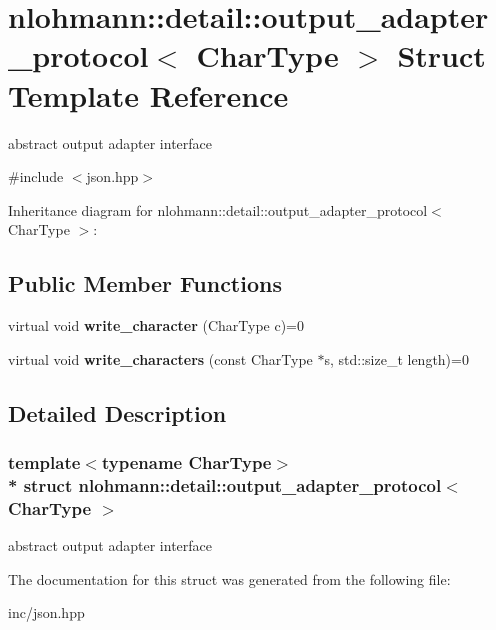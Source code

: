 \hypertarget{structnlohmann_1_1detail_1_1output__adapter__protocol}{}\section{nlohmann\+:\+:detail\+:\+:output\+\_\+adapter\+\_\+protocol$<$ Char\+Type $>$ Struct Template Reference}
\label{structnlohmann_1_1detail_1_1output__adapter__protocol}


abstract output adapter interface  




{\ttfamily \#include $<$json.\+hpp$>$}



Inheritance diagram for nlohmann\+:\+:detail\+:\+:output\+\_\+adapter\+\_\+protocol$<$ Char\+Type $>$\+:
\subsection*{Public Member Functions}
\begin{DoxyCompactItemize}
\item 
virtual void {\bfseries write\+\_\+character} (Char\+Type c)=0\hypertarget{structnlohmann_1_1detail_1_1output__adapter__protocol_a3381896fe1be557f591de2e917cdc7d5}{}\label{structnlohmann_1_1detail_1_1output__adapter__protocol_a3381896fe1be557f591de2e917cdc7d5}

\item 
virtual void {\bfseries write\+\_\+characters} (const Char\+Type $\ast$s, std\+::size\+\_\+t length)=0\hypertarget{structnlohmann_1_1detail_1_1output__adapter__protocol_a2f410a164e0eda17cf6561114b0eee4a}{}\label{structnlohmann_1_1detail_1_1output__adapter__protocol_a2f410a164e0eda17cf6561114b0eee4a}

\end{DoxyCompactItemize}


\subsection{Detailed Description}
\subsubsection*{template$<$typename Char\+Type$>$\\*
struct nlohmann\+::detail\+::output\+\_\+adapter\+\_\+protocol$<$ Char\+Type $>$}

abstract output adapter interface 

The documentation for this struct was generated from the following file\+:\begin{DoxyCompactItemize}
\item 
inc/json.\+hpp\end{DoxyCompactItemize}
